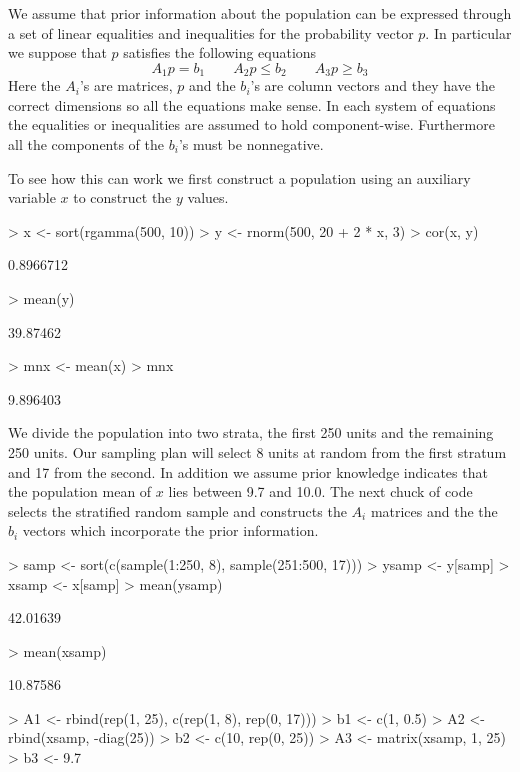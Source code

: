 \documentclass{article}
\begin{document}
We assume that prior information about the population  can be 
expressed through a set of linear equalities and inequalities
for the probability vector $p$. In particular we suppose 
that $p$ satisfies the following equations
\[
A_1 p = b_1 \quad \quad A_2 p \leq  b_2 \quad \quad A_3 p \geq b_3
\]
Here the $A_i$'s are matrices, $p$ and the $b_i$'s are column 
vectors and they have the correct dimensions so all the equations
make sense. In each system of equations the equalities or 
inequalities are assumed to hold component-wise. Furthermore all
the components of the $b_i$'s must be nonnegative.


To see how this can work 
we first construct a population using an auxiliary
variable $x$ to construct the $y$ values. 

\begin{Schunk}
\begin{Sinput}
> x <- sort(rgamma(500, 10))
> y <- rnorm(500, 20 + 2 * x, 3)
> cor(x, y)
\end{Sinput}
\begin{Soutput}
[1] 0.8966712
\end{Soutput}
\begin{Sinput}
> mean(y)
\end{Sinput}
\begin{Soutput}
[1] 39.87462
\end{Soutput}
\begin{Sinput}
> mnx <- mean(x)
> mnx
\end{Sinput}
\begin{Soutput}
[1] 9.896403
\end{Soutput}
\end{Schunk}


We divide the population into two strata, the first 250 units 
and the remaining 250 units. Our sampling plan will select 8 
units at random from the first stratum and 17 from the second.
In addition we assume prior knowledge indicates that 
the population mean of $x$ lies between 9.7 and 10.0.
The next chuck of code selects the stratified random 
sample and constructs the $A_i$ matrices and the the $b_i$
vectors which incorporate the prior information.

\begin{Schunk}
\begin{Sinput}
> samp <- sort(c(sample(1:250, 8), sample(251:500, 17)))
> ysamp <- y[samp]
> xsamp <- x[samp]
> mean(ysamp)
\end{Sinput}
\begin{Soutput}
[1] 42.01639
\end{Soutput}
\begin{Sinput}
> mean(xsamp)
\end{Sinput}
\begin{Soutput}
[1] 10.87586
\end{Soutput}
\begin{Sinput}
> A1 <- rbind(rep(1, 25), c(rep(1, 8), rep(0, 17)))
> b1 <- c(1, 0.5)
> A2 <- rbind(xsamp, -diag(25))
> b2 <- c(10, rep(0, 25))
> A3 <- matrix(xsamp, 1, 25)
> b3 <- 9.7
\end{Sinput}
\end{Schunk}
\end{document}
